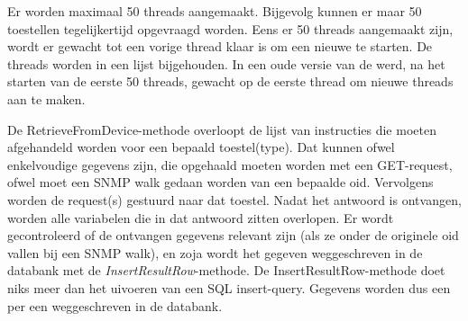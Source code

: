 Er worden maximaal 50 threads aangemaakt.
Bijgevolg kunnen er maar 50 toestellen tegelijkertijd opgevraagd worden.
Eens er 50 threads aangemaakt zijn, wordt er gewacht tot een vorige thread klaar is om een nieuwe te starten.
De threads worden in een lijst bijgehouden.
In een oude versie van de \nwmretriever{} werd, na het starten van de eerste 50 threads, gewacht op
de eerste thread om nieuwe threads aan te maken.

De RetrieveFromDevice-methode overloopt de lijst van instructies die moeten afgehandeld worden voor een bepaald toestel(type).
Dat kunnen ofwel enkelvoudige gegevens zijn, die opgehaald moeten worden met een GET-request, ofwel moet een SNMP walk gedaan worden van een bepaalde \gls{oid}.
Vervolgens worden de request(s) gestuurd naar dat toestel.
Nadat het antwoord is ontvangen, worden alle variabelen die in dat antwoord zitten overlopen.
Er wordt gecontroleerd of de ontvangen gegevens relevant zijn (als ze onder de originele \gls{oid} vallen bij een SNMP walk),
en zoja wordt het gegeven weggeschreven in de databank met de \textit{InsertResultRow}-methode.
De InsertResultRow-methode doet niks meer dan het uivoeren van een SQL insert-query.
Gegevens worden dus een per een weggeschreven in de databank.
